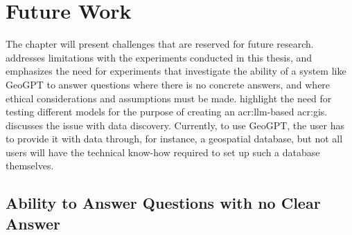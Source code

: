 \chapter{Future Work}
\label{cha:future-work}

\begin{comment}
Consider where you would like to extend or improve this work, or how somebody else could continue it.
These extensions might either be continuing the ongoing direction or taking a side direction that became obvious during the work.
Further, possible solutions to limitations in the work conducted, highlighted in Section~\ref{sec:discussion} may be presented.

Note that in the Specialisation Project Report, the Future Work section will be a key part of your plan for the novel work to be carried out in the next semester,
while in the Master's Thesis, the Future Work section rather will point to issues that others might be interested in addressing.
This can include options and alternatives that you did not try out yourself, or potential improvements and extensions to your experiments or system.
\end{comment}

The  chapter will present challenges that are reserved for future research.  addresses limitations with the experiments conducted in this thesis, and emphasizes the need for experiments that investigate the ability of a system like GeoGPT to answer questions where there is no concrete answers, and where ethical considerations and assumptions must be made.  highlight the need for testing different models for the purpose of creating an \acrshort{acr:llm}-based \acrshort{acr:gis}.  discusses the issue with data discovery. Currently, to use GeoGPT, the user has to provide it with data through, for instance, a geospatial database, but not all users will have the technical know-how required to set up such a database themselves.

\section{Ability to Answer Questions with no Clear Answer}
\label{sec:no-clear-answer}

